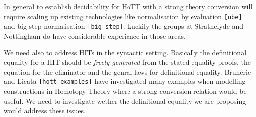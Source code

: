 \documentclass[twocolumn,a4paper,11pt]{article}
\renewcommand{\cite}[1]{{\tt[#1]}}
\begin{document}
In general to establish decidability for HoTT with a strong theory
conversion will require scaling up existing technologies like
normalisation by evaluation \cite{nbe} and big-step normalisation
\cite{big-step}. Luckily the groups at Strathclyde and Nottingham do
have considerable experience in those areas.

We need also to address HITs in the syntactic setting. Basically the
definitional equality for a HIT should be \emph{freely generated} from
the stated equality proofs, the equation for the eliminator and the
genral laws for definitional equality. Brunerie and Licata
\cite{hott-examples} have investigated many examples when modelling
constructions in Homotopy Theory where a strong conversion relation
would be useful. We need to investigate wether the definitional
equality we are proposing would address these issues.





\end{document}

